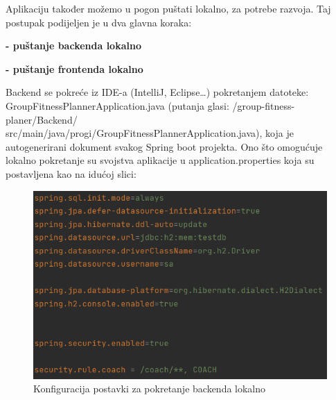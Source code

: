 {            {Aplikaciju također možemo u pogon puštati lokalno, za potrebe razvoja. Taj postupak podijeljen je u dva glavna koraka: 
            \item \textbf{- puštanje backenda lokalno}
            \item \textbf{- puštanje frontenda lokalno\\}}

            {Backend se pokreće iz IDE-a (IntelliJ, Eclipse…) pokretanjem datoteke: GroupFitnessPlannerApplication.java (putanja glasi: /group-fitness-planer/Backend/\\src/main/java/progi/GroupFitnessPlannerApplication.java), koja je autogenerirani dokument svakog Spring boot projekta. Ono što omogućuje lokalno pokretanje su svojstva aplikacije u application.properties koja su postavljena kao na idućoj slici: }
             \begin{figure}[H]
                      \includegraphics[scale=0.7]{./Slike/lokalno.png}
                      \centering
                      \caption{Konfiguracija postavki za pokretanje backenda lokalno}
                      \label{fig:promjene}
                \end{figure}

}
